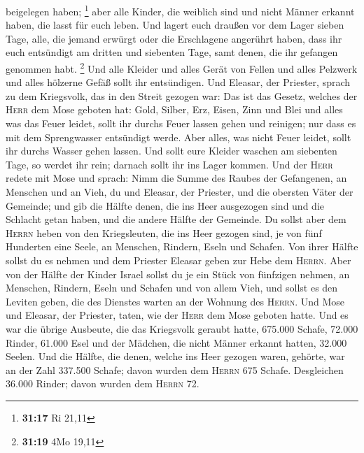beigelegen haben; \footnote{\textbf{31:17} Ri 21,11} 
aber alle Kinder, die weiblich sind und nicht Männer erkannt haben, die
lasst für euch leben.  Und lagert euch draußen vor dem
Lager sieben Tage, alle, die jemand erwürgt oder die Erschlagene
angerührt haben, dass ihr euch entsündigt am dritten und siebenten Tage,
samt denen, die ihr gefangen genommen habt. \footnote{\textbf{31:19} 4Mo
  19,11}  Und alle Kleider und alles Gerät von Fellen und
alles Pelzwerk und alles hölzerne Gefäß sollt ihr entsündigen.
 Und Eleasar, der Priester, sprach zu dem Kriegsvolk, das
in den Streit gezogen war: Das ist das Gesetz, welches der \textsc{Herr}
dem Mose geboten hat:  Gold, Silber, Erz, Eisen, Zinn und
Blei  und alles was das Feuer leidet, sollt ihr durchs
Feuer lassen gehen und reinigen; nur dass es mit dem Sprengwasser
entsündigt werde. Aber alles, was nicht Feuer leidet, sollt ihr durchs
Wasser gehen lassen.  Und sollt eure Kleider waschen am
siebenten Tage, so werdet ihr rein; darnach sollt ihr ins Lager kommen.
 Und der \textsc{Herr} redete mit Mose und sprach:
 Nimm die Summe des Raubes der Gefangenen, an Menschen
und an Vieh, du und Eleasar, der Priester, und die obersten Väter der
Gemeinde;  und gib die Hälfte denen, die ins Heer
ausgezogen sind und die Schlacht getan haben, und die andere Hälfte der
Gemeinde.  Du sollst aber dem \textsc{Herrn} heben von
den Kriegsleuten, die ins Heer gezogen sind, je von fünf Hunderten eine
Seele, an Menschen, Rindern, Eseln und Schafen.  Von
ihrer Hälfte sollst du es nehmen und dem Priester Eleasar geben zur Hebe
dem \textsc{Herrn}.  Aber von der Hälfte der Kinder
Israel sollst du je ein Stück von fünfzigen nehmen, an Menschen,
Rindern, Eseln und Schafen und von allem Vieh, und sollst es den Leviten
geben, die des Dienstes warten an der Wohnung des \textsc{Herrn}.
 Und Mose und Eleasar, der Priester, taten, wie der
\textsc{Herr} dem Mose geboten hatte.  Und es war die
übrige Ausbeute, die das Kriegsvolk geraubt hatte, 675.000 Schafe,
 72.000 Rinder,  61.000 Esel
 und der Mädchen, die nicht Männer erkannt hatten, 32.000
Seelen.  Und die Hälfte, die denen, welche ins Heer
gezogen waren, gehörte, war an der Zahl 337.500 Schafe; 
davon wurden dem \textsc{Herrn} 675 Schafe.  Desgleichen
36.000 Rinder; davon wurden dem \textsc{Herrn} 72. 
